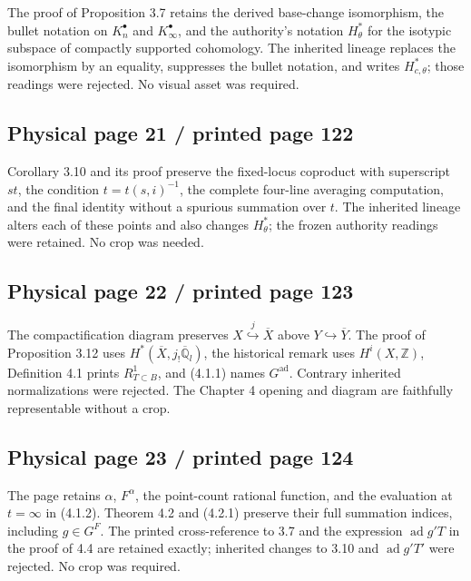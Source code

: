 \documentclass[10pt]{article}
\begin{document}
The proof of Proposition 3.7 retains the derived base-change isomorphism, the bullet notation on \(K_n^\bullet\) and \(K_\infty^\bullet\), and the authority's notation \(H_\theta^*\) for the isotypic subspace of compactly supported cohomology. The inherited lineage replaces the isomorphism by an equality, suppresses the bullet notation, and writes \(H_{c,\theta}^*\); those readings were rejected. No visual asset was required.\par

\subsection*{Physical page 21 / printed page 122}

Corollary 3.10 and its proof preserve the fixed-locus coproduct with superscript \(st\), the condition \(t=t(s,i)^{-1}\), the complete four-line averaging computation, and the final identity without a spurious summation over \(t\). The inherited lineage alters each of these points and also changes \(H_\theta^*\); the frozen authority readings were retained. No crop was needed.\par

\subsection*{Physical page 22 / printed page 123}

The compactification diagram preserves \(X\overset{j}{\hookrightarrow}\overline X\) above \(Y\hookrightarrow\overline Y\). The proof of Proposition 3.12 uses \(H^*(\overline X,j_!\overline{\mathbb Q}_l)\), the historical remark uses \(H^i(X,\mathbb Z)\), Definition 4.1 prints \(R_{T\subset B}^1\), and (4.1.1) names \(G^{\mathrm{ad}}\). Contrary inherited normalizations were rejected. The Chapter 4 opening and diagram are faithfully representable without a crop.\par

\subsection*{Physical page 23 / printed page 124}

The page retains \(\alpha\), \(F^\alpha\), the point-count rational function, and the evaluation at \(t=\infty\) in (4.1.2). Theorem 4.2 and (4.2.1) preserve their full summation indices, including \(g\in G^F\). The printed cross-reference to 3.7 and the expression \(\operatorname{ad}g'T\) in the proof of 4.4 are retained exactly; inherited changes to 3.10 and \(\operatorname{ad}g'T'\) were rejected. No crop was required.\par
\end{document}
